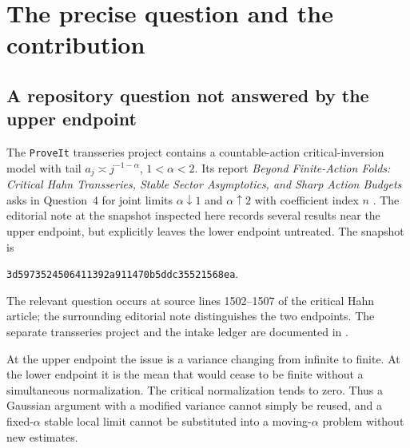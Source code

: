 \documentclass[11pt,a4paper]{article}
\numberwithin{equation}{section}
\theoremstyle{definition}
\theoremstyle{remark}
\newcommand{\commit}{\texttt{3d5973524506411392a911470b5ddc35521568ea}}
\begin{document}
\clearpage\begingroup\small\setlength{\parskip}{0pt}\tableofcontents\endgroup\clearpage

\section{The precise question and the contribution}
\label{sec:intro}

\subsection{A repository question not answered by the upper endpoint}
The \texttt{ProveIt} transseries project contains a countable-action
critical-inversion model with tail $a_j\asymp j^{-1-\alpha}$,
$1<\alpha<2$. Its report \emph{Beyond Finite-Action Folds: Critical Hahn
Transseries, Stable Sector Asymptotics, and Sharp Action Budgets} asks in
Question~4 for joint limits $\alpha\downarrow1$ and $\alpha\uparrow2$ with
coefficient index $n$ \cite{repo-critical}. The editorial note at the
snapshot inspected here records several results near the upper endpoint,
but explicitly leaves the lower endpoint untreated. The snapshot is
\begin{center}\small\commit.\end{center}
The relevant question occurs at source lines 1502--1507 of the critical
Hahn article; the surrounding editorial note distinguishes the two endpoints.
The separate transseries project and the intake ledger are documented in
\cite{repo-project,repo-index}.

At the upper endpoint the issue is a variance changing from infinite to
finite. At the lower endpoint it is the mean that would cease to be finite
without a simultaneous normalization. The critical normalization tends to
zero. Thus a Gaussian argument with a modified variance cannot simply be
reused, and a fixed-$\alpha$ stable local limit cannot be substituted into a
moving-$\alpha$ problem without new estimates.
\end{document}
